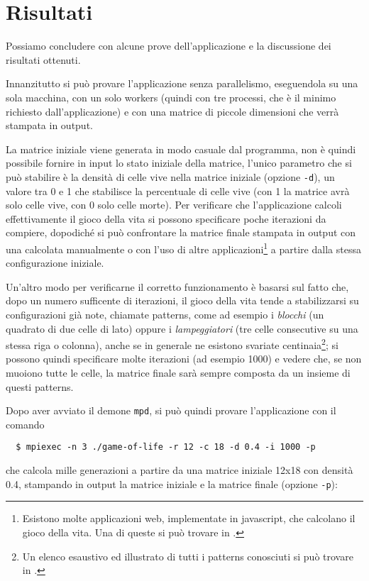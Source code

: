 \section{Risultati}
\label{sec:results}
Possiamo concludere con alcune prove dell'applicazione e la discussione dei risultati ottenuti.

Innanzitutto si pu\`o provare l'applicazione senza parallelismo, eseguendola su una sola macchina, con un solo workers (quindi con tre processi, che \`e il minimo richiesto dall'applicazione) e con una matrice di piccole dimensioni che verr\`a stampata in output.

La matrice iniziale viene generata in modo casuale dal programma, non \`e quindi possibile fornire in input lo stato iniziale della matrice, l'unico parametro che si pu\`o stabilire \`e la densit\`a di celle vive nella matrice iniziale (opzione \texttt{-d}), un valore tra 0 e 1 che stabilisce la percentuale di celle vive (con 1 la matrice avr\`a solo celle vive, con 0 solo celle morte). Per verificare che l'applicazione calcoli effettivamente il gioco della vita si possono specificare poche iterazioni da compiere, dopodich\'e si pu\`o confrontare la matrice finale stampata in output con una calcolata manualmente o con l'uso di altre applicazioni\footnote{Esistono molte applicazioni web, implementate in javascript, che calcolano il gioco della vita. Una di queste si pu\`o trovare in \cite{bib:ref2}.} a partire dalla stessa configurazione iniziale.

Un'altro modo per verificarne il corretto funzionamento \`e basarsi sul fatto che, dopo un numero sufficente di iterazioni, il gioco della vita tende a stabilizzarsi su configurazioni gi\`a note, chiamate patterns, come ad esempio i \textit{blocchi} (un quadrato di due celle di lato) oppure i \textit{lampeggiatori} (tre celle consecutive su una stessa riga o colonna), anche se in generale ne esistono svariate centinaia\footnote{Un elenco esaustivo ed illustrato di tutti i patterns conosciuti si pu\`o trovare in \cite{bib:ref1}.}; si possono quindi specificare molte iterazioni (ad esempio 1000) e vedere che, se non muoiono tutte le celle, la matrice finale sar\`a sempre composta da un insieme di questi patterns.

Dopo aver avviato il demone \texttt{mpd}, si pu\`o quindi provare l'applicazione con il comando
\begin{verbatim}
  $ mpiexec -n 3 ./game-of-life -r 12 -c 18 -d 0.4 -i 1000 -p
\end{verbatim}
che calcola mille generazioni a partire da una matrice iniziale 12x18 con densit\`a 0.4, stampando in output la matrice iniziale e la matrice finale (opzione \texttt{-p}):

